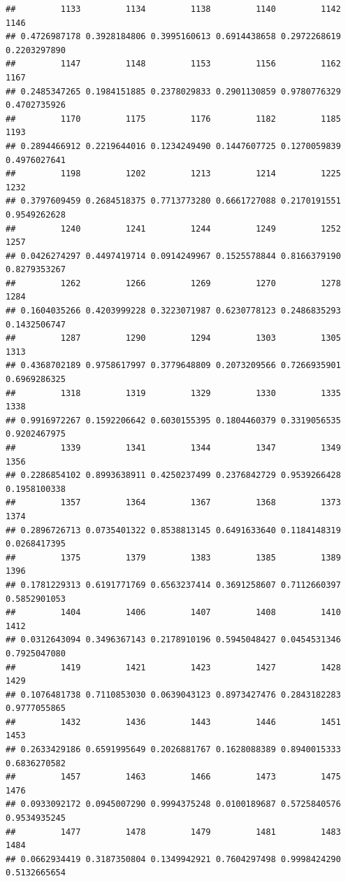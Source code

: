 \documentclass[
]{article}
\begin{document}
\begin{verbatim}
##         1133         1134         1138         1140         1142         1146 
## 0.4726987178 0.3928184806 0.3995160613 0.6914438658 0.2972268619 0.2203297890 
##         1147         1148         1153         1156         1162         1167 
## 0.2485347265 0.1984151885 0.2378029833 0.2901130859 0.9780776329 0.4702735926 
##         1170         1175         1176         1182         1185         1193 
## 0.2894466912 0.2219644016 0.1234249490 0.1447607725 0.1270059839 0.4976027641 
##         1198         1202         1213         1214         1225         1232 
## 0.3797609459 0.2684518375 0.7713773280 0.6661727088 0.2170191551 0.9549262628 
##         1240         1241         1244         1249         1252         1257 
## 0.0426274297 0.4497419714 0.0914249967 0.1525578844 0.8166379190 0.8279353267 
##         1262         1266         1269         1270         1278         1284 
## 0.1604035266 0.4203999228 0.3223071987 0.6230778123 0.2486835293 0.1432506747 
##         1287         1290         1294         1303         1305         1313 
## 0.4368702189 0.9758617997 0.3779648809 0.2073209566 0.7266935901 0.6969286325 
##         1318         1319         1329         1330         1335         1338 
## 0.9916972267 0.1592206642 0.6030155395 0.1804460379 0.3319056535 0.9202467975 
##         1339         1341         1344         1347         1349         1356 
## 0.2286854102 0.8993638911 0.4250237499 0.2376842729 0.9539266428 0.1958100338 
##         1357         1364         1367         1368         1373         1374 
## 0.2896726713 0.0735401322 0.8538813145 0.6491633640 0.1184148319 0.0268417395 
##         1375         1379         1383         1385         1389         1396 
## 0.1781229313 0.6191771769 0.6563237414 0.3691258607 0.7112660397 0.5852901053 
##         1404         1406         1407         1408         1410         1412 
## 0.0312643094 0.3496367143 0.2178910196 0.5945048427 0.0454531346 0.7925047080 
##         1419         1421         1423         1427         1428         1429 
## 0.1076481738 0.7110853030 0.0639043123 0.8973427476 0.2843182283 0.9777055865 
##         1432         1436         1443         1446         1451         1453 
## 0.2633429186 0.6591995649 0.2026881767 0.1628088389 0.8940015333 0.6836270582 
##         1457         1463         1466         1473         1475         1476 
## 0.0933092172 0.0945007290 0.9994375248 0.0100189687 0.5725840576 0.9534935245 
##         1477         1478         1479         1481         1483         1484 
## 0.0662934419 0.3187350804 0.1349942921 0.7604297498 0.9998424290 0.5132665654 

\end{verbatim}
\end{document}
